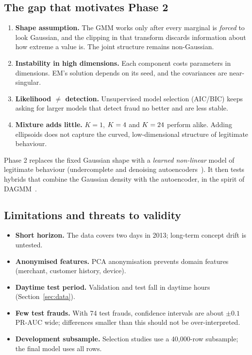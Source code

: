 \documentclass[12pt]{article}
\begin{document}
\subsection{The gap that motivates Phase 2}
\begin{enumerate}
\item \textbf{Shape assumption.} The GMM works only after every marginal is \emph{forced} to look Gaussian, and the
clipping in that transform discards information about how extreme a value is. The joint structure remains
non-Gaussian.
\item \textbf{Instability in high dimensions.} Each component costs \perComp{} parameters in \selD{} dimensions. EM's
solution depends on its seed, and the covariances are near-singular.
\item \textbf{Likelihood $\neq$ detection.} Unsupervised model selection (AIC/BIC) keeps asking for larger models that
detect fraud no better and are less stable.
\item \textbf{Mixture adds little.} $K=1$, $K=4$ and $K=24$ perform alike. Adding ellipsoids does not capture
the curved, low-dimensional structure of legitimate behaviour.
\end{enumerate}
Phase 2 replaces the fixed Gaussian shape with a \emph{learned non-linear} model of legitimate behaviour (undercomplete
and denoising autoencoders~\cite{sakurada2014,vincent2008}). It then tests hybrids that combine the Gaussian density
with the autoencoder, in the spirit of DAGMM~\cite{zong2018}.

\subsection{Limitations and threats to validity}
\begin{itemize}
\item \textbf{Short horizon.} The data covers two days in 2013; long-term concept drift is untested.
\item \textbf{Anonymised features.} PCA anonymisation prevents domain features (merchant, customer history, device).
\item \textbf{Daytime test period.} Validation and test fall in daytime hours (Section~\ref{sec:data}).
\item \textbf{Few test frauds.} With 74 test frauds, confidence intervals are about $\pm0.1$ PR-AUC wide; differences
smaller than this should not be over-interpreted.
\item \textbf{Development subsample.} Selection studies use a 40{,}000-row subsample; the final model uses all rows.
\end{itemize}
\end{document}
